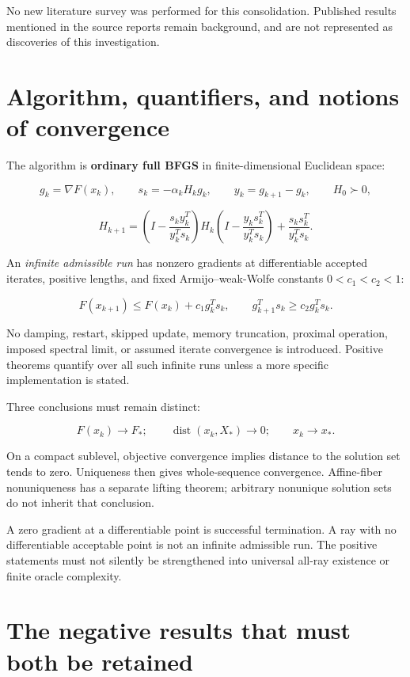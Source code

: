 \documentclass[10pt,oneside,openany]{book}
\theoremstyle{remark}\newtheorem{remark}{Remark}[chapter]
\begin{document}
No new literature survey was performed for this consolidation. Published results mentioned in the source reports remain background, and are not represented as discoveries of this investigation.

\section{Algorithm, quantifiers, and notions of convergence}\label{algorithm-quantifiers-and-notions-of-convergence}

The algorithm is \textbf{ordinary full BFGS} in finite-dimensional Euclidean space:

\[
 g_k=\nabla F(x_k),\qquad s_k=-\alpha_kH_kg_k,\qquad
 y_k=g_{k+1}-g_k,\qquad H_0\succ0,
\]

\[
 H_{k+1}=\left(I-\frac{s_ky_k^T}{y_k^Ts_k}\right)H_k
 \left(I-\frac{y_ks_k^T}{y_k^Ts_k}\right)
 +\frac{s_ks_k^T}{y_k^Ts_k}.
\]

An \emph{infinite admissible run} has nonzero gradients at differentiable accepted iterates, positive lengths, and fixed Armijo--weak-Wolfe constants \(0<c_1<c_2<1\):

\[
 F(x_{k+1})\le F(x_k)+c_1g_k^Ts_k,\qquad
 g_{k+1}^Ts_k\ge c_2g_k^Ts_k.
\]

No damping, restart, skipped update, memory truncation, proximal operation, imposed spectral limit, or assumed iterate convergence is introduced. Positive theorems quantify over all such infinite runs unless a more specific implementation is stated.

Three conclusions must remain distinct:

\[
 F(x_k)\to F_*;\qquad \operatorname{dist}(x_k,X_*)\to0;\qquad x_k\to x_*.
\]

On a compact sublevel, objective convergence implies distance to the solution set tends to zero. Uniqueness then gives whole-sequence convergence. Affine-fiber nonuniqueness has a separate lifting theorem; arbitrary nonunique solution sets do not inherit that conclusion.

A zero gradient at a differentiable point is successful termination. A ray with no differentiable acceptable point is not an infinite admissible run. The positive statements must not silently be strengthened into universal all-ray existence or finite oracle complexity.

\section{The negative results that must both be retained}\label{the-negative-results-that-must-both-be-retained}
\end{document}
